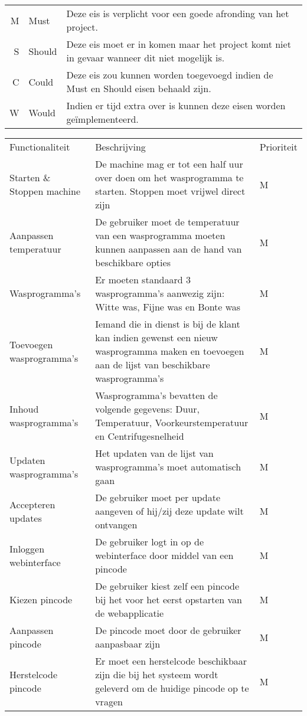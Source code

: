 \begin{tabular}{ r  l p{9cm} }
M & Must & Deze eis is verplicht voor een goede afronding van het project. \\
S & Should & Deze eis moet er in komen maar het project komt niet in gevaar wanneer dit niet mogelijk is. \\
C & Could & Deze eis zou kunnen worden toegevoegd indien de Must en Should eisen behaald zijn. \\
W & Would & Indien er tijd extra over is kunnen deze eisen worden geïmplementeerd. \\
\end{tabular}

\begin{longtable}{ p{3cm} p{7cm} l }
Functionaliteit & Beschrijving & Prioriteit \\
Starten \& Stoppen machine & De machine mag er tot een half uur over doen om het wasprogramma te starten. Stoppen moet vrijwel direct zijn & M \\
Aanpassen temperatuur & De gebruiker moet de temperatuur van een wasprogramma moeten kunnen aanpassen aan de hand van beschikbare opties & M \\
Wasprogramma's & Er moeten standaard 3 wasprogramma's aanwezig zijn: Witte was, Fijne was en Bonte was & M \\
Toevoegen wasprogramma's & Iemand die in dienst is bij de klant kan indien gewenst een nieuw wasprogramma maken en toevoegen aan de lijst van beschikbare wasprogramma's & M \\
Inhoud wasprogramma's & Wasprogramma's bevatten de volgende gegevens: Duur, Temperatuur, Voorkeurstemperatuur en Centrifugesnelheid & M \\
Updaten wasprogramma's & Het updaten van de lijst van wasprogramma's moet automatisch gaan & M \\
Accepteren updates & De gebruiker moet per update aangeven of hij/zij deze update wilt ontvangen & M \\
Inloggen webinterface & De gebruiker logt in op de webinterface door middel van een pincode & M \\
Kiezen pincode & De gebruiker kiest zelf een pincode bij het voor het eerst opstarten van de webapplicatie & M \\
Aanpassen pincode & De pincode moet door de gebruiker aanpasbaar zijn & M \\
Herstelcode pincode & Er moet een herstelcode beschikbaar zijn die bij het systeem wordt geleverd om de huidige pincode op te vragen & M \\

\end{longtable}
